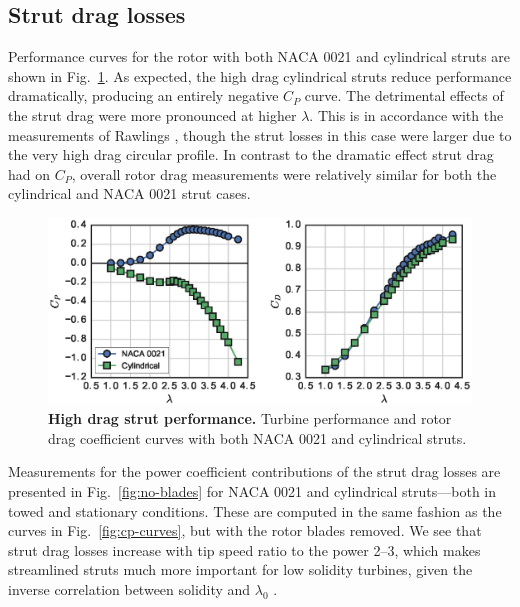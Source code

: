 \documentclass[10pt,letterpaper]{article}
\begin{document}
\subsection*{Strut drag losses}

Performance curves for the rotor with both NACA 0021 and cylindrical struts are
shown in Fig.~\ref{fig:perf-covers}. As expected, the high drag cylindrical
struts reduce performance dramatically, producing an entirely negative $C_P$
curve. The detrimental effects of the strut drag were more pronounced at higher
$\lambda$. This is in accordance with the measurements of Rawlings
\cite{Rawlings2008}, though the strut losses in this case were larger due to the
very high drag circular profile. In contrast to the dramatic effect strut drag
had on $C_P$, overall rotor drag measurements were relatively similar for both
the cylindrical and NACA 0021 strut cases.

\begin{figure}
    \includegraphics[width=\textwidth]{figures/perf_covers.eps}

    \caption{{\bf High drag strut performance.} Turbine performance and rotor
        drag coefficient curves with both NACA 0021 and cylindrical struts.}

    \label{fig:perf-covers}
\end{figure}

Measurements for the power coefficient contributions of the strut drag losses
are presented in Fig.~\ref{fig:no-blades} for NACA 0021 and cylindrical
struts---both in towed and stationary conditions. These are computed in the same
fashion as the curves in Fig.~\ref{fig:cp-curves}, but with the rotor blades
removed. We see that strut drag losses increase with tip speed ratio to the
power 2--3, which makes streamlined struts much more important for low solidity
turbines, given the inverse correlation between solidity and $\lambda_0$
\cite{Templin1974}.
\end{document}
